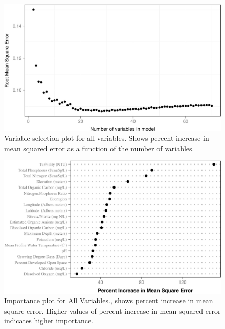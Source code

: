 \documentclass[12pt,]{article}
\begin{document}
\begin{figure}[htbp]
\centering
\includegraphics{manuscript_files/figure-latex/all_var_sel_figure-1.jpeg}
\caption{Variable selection plot for all variables. Shows percent
increase in mean squared error as a function of the number of variables.
\label{fig:all_varsel_figure}}
\end{figure}

\newpage

\begin{figure}[htbp]
\centering
\includegraphics{manuscript_files/figure-latex/All_Importance-1.jpeg}
\caption{Importance plot for All Variables., shows percent increase in
mean square error. Higher values of percent increase in mean squared
error indicates higher importance. \label{fig:All_Importance}}
\end{figure}

\newpage
\end{document}
